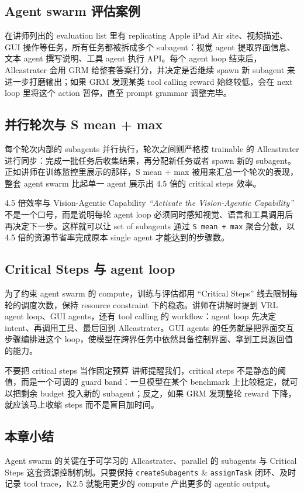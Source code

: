 \subsection{Agent swarm 评估案例}
在讲师列出的 evaluation list 里有 replicating Apple iPad Air site、视频描述、GUI 操作等任务，所有任务都被拆成多个 subagent：视觉 agent 提取界面信息、文本 agent 撰写说明、工具 agent 执行 API。每个 agent loop 结束后，Allcastrater 会用 GRM 给整套答案打分，并决定是否继续 spawn 新 subagent 来进一步打磨输出；如果 GRM 发现某类 tool calling reward 始终较低，会在 next loop 里将这个 action 暂停，直至 prompt grammar 调整完毕。

\subsection{并行轮次与 S mean + max}
每个轮次内部的 subagents 并行执行，轮次之间则严格按 trainable 的 Allcastrater 进行同步：完成一批任务后收集结果，再分配新任务或者 spawn 新的 subagent。正如讲师在训练监控里展示的那样，S mean + max 被用来汇总一个轮次的表现，整套 agent swarm 比起单一 agent 展示出 4.5 倍的 critical steps 效率。

\begin{importantbox}{4.5 倍效率与 Vision-Agentic Capability}
\textit{``Activate the Vision-Agentic Capability''} 不是一个口号，而是说明每轮 agent loop 必须同时感知视觉、语言和工具调用后再决定下一步。这样就可以让 set of subagents 通过 \texttt{S mean + max} 聚合分数，以 4.5 倍的资源节省率完成原本 single agent 才能达到的步骤数。
\end{importantbox}

\subsection{Critical Steps 与 agent loop}
为了约束 agent swarm 的 compute，训练与评估都用 ``Critical Steps'' 线去限制每轮的调度次数，保持 resource constraint 下的稳态。讲师在讲解时提到 VRL agent loop、GUI agents，还有 tool calling 的 workflow：agent loop 先决定 intent、再调用工具、最后回到 Allcastrater。GUI agents 的任务就是把界面交互步骤编排进这个 loop，使模型在跨界任务中依然具备控制界面、拿到工具返回值的能力。

\begin{warningbox}{不要把 critical steps 当作固定预算}
讲师提醒我们，critical steps 不是静态的阈值，而是一个可调的 guard band：一旦模型在某个 benchmark 上比较稳定，就可以把剩余 budget 投入新的 subagent；反之，如果 GRM 发现整轮 reward 下降，就应该马上收缩 steps 而不是盲目加时间。
\end{warningbox}

\subsection{本章小结}
Agent swarm 的关键在于可学习的 Allcastrater、parallel 的 subagents 与 Critical Steps 这套资源控制机制。只要保持 \texttt{createSubagents} \& \texttt{assignTask} 闭环、及时记录 tool trace，K2.5 就能用更少的 compute 产出更多的 agentic output。
